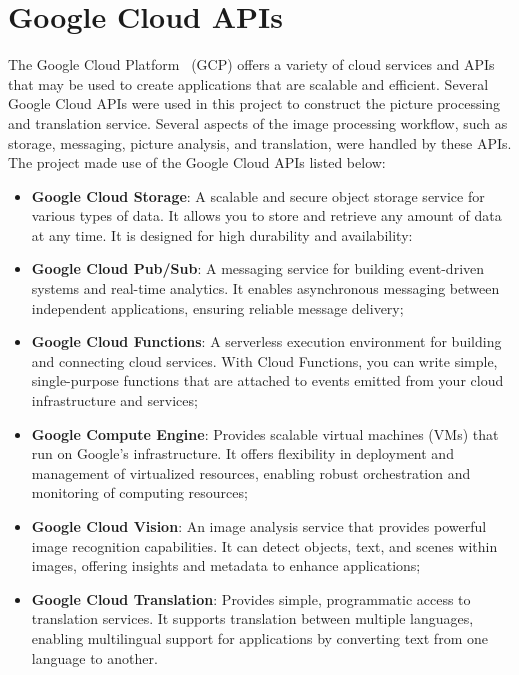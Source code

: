 \chapter{Google Cloud APIs}\label{ch:google_cloud_apis}

The Google Cloud Platform~\cite{google-cloud-platform} (GCP) offers a variety of cloud services and APIs that may be used to create applications that are scalable and efficient. Several Google Cloud APIs were used in this project to construct the picture processing and translation service. Several aspects of the image processing workflow, such as storage, messaging, picture analysis, and translation, were handled by these APIs. The project made use of the Google Cloud APIs listed below:

\begin{itemize}
    \item \textbf{Google Cloud Storage}: A scalable and secure object storage service for various types of data. It allows you to store and retrieve any amount of data at any time. It is designed for high durability and availability:
    \item \textbf{Google Cloud Pub/Sub}: A messaging service for building event-driven systems and real-time analytics. It enables asynchronous messaging between independent applications, ensuring reliable message delivery;
    \item \textbf{Google Cloud Functions}: A serverless execution environment for building and connecting cloud services. With Cloud Functions, you can write simple, single-purpose functions that are attached to events emitted from your cloud infrastructure and services;
    \item \textbf{Google Compute Engine}: Provides scalable virtual machines (VMs) that run on Google’s infrastructure. It offers flexibility in deployment and management of virtualized resources, enabling robust orchestration and monitoring of computing resources;
    \item \textbf{Google Cloud Vision}: An image analysis service that provides powerful image recognition capabilities. It can detect objects, text, and scenes within images, offering insights and metadata to enhance applications;
    \item \textbf{Google Cloud Translation}: Provides simple, programmatic access to translation services. It supports translation between multiple languages, enabling multilingual support for applications by converting text from one language to another.
\end{itemize}
